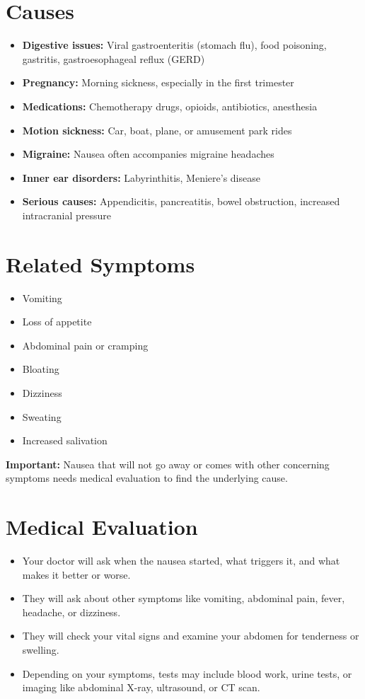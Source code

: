 \section*{Causes}
\begin{itemize}
  \item \textbf{Digestive issues:} Viral gastroenteritis (stomach flu), food poisoning, gastritis, gastroesophageal reflux (GERD)
  \item \textbf{Pregnancy:} Morning sickness, especially in the first trimester
  \item \textbf{Medications:} Chemotherapy drugs, opioids, antibiotics, anesthesia
  \item \textbf{Motion sickness:} Car, boat, plane, or amusement park rides
  \item \textbf{Migraine:} Nausea often accompanies migraine headaches
  \item \textbf{Inner ear disorders:} Labyrinthitis, Meniere's disease
  \item \textbf{Serious causes:} Appendicitis, pancreatitis, bowel obstruction, increased intracranial pressure
\end{itemize}

\section*{Related Symptoms}
\begin{itemize}
  \item Vomiting
  \item Loss of appetite
  \item Abdominal pain or cramping
  \item Bloating
  \item Dizziness
  \item Sweating
  \item Increased salivation
\end{itemize}
\textbf{Important:} Nausea that will not go away or comes with other concerning symptoms needs medical evaluation to find the underlying cause.

\section*{Medical Evaluation}
\begin{itemize}
  \item Your doctor will ask when the nausea started, what triggers it, and what makes it better or worse.
  \item They will ask about other symptoms like vomiting, abdominal pain, fever, headache, or dizziness.
  \item They will check your vital signs and examine your abdomen for tenderness or swelling.
  \item Depending on your symptoms, tests may include blood work, urine tests, or imaging like abdominal X-ray, ultrasound, or CT scan.
\end{itemize}

